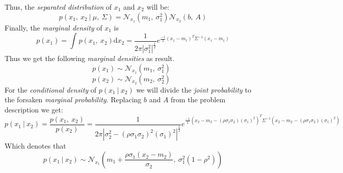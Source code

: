\documentclass[12pt]{article}
\numberwithin{equation}{section}
\numberwithin{table}{section}
\numberwithin{figure}{section}
\begin{document}
Thus, the \textit{separated distribution} of $x_1$ and $x_2$ will be:
$$
	p(x_1,\ x_2\ |\ \mu,\ \Sigma) = \mathcal{N}_{x_1}(m_1,\ \sigma_{1}^2)\mathcal{N}_{x_2}(b,\ A)
$$
Finally, the \textit{marginal density} of $x_1$ is
$$
	p(x_1) = \int_{}^{}p(x_1,\ x_2)\mathrm{d}x_2 = \frac{1}{2\pi|\sigma_{1}^2|^\frac{1}{2}} e^{\frac{-1}{2}(x_1 - m_1)^T\Sigma^{-1}(x_1 - m_1)}
$$
Thus we get the following \textit{marginal densities} as result.
$$
	p(x_1) \sim \mathcal{N}_{x_1}(m_1,\ \sigma_1^2)\ \
$$
$$
	p(x_2) \sim \mathcal{N}_{x_2}(m_2,\ \sigma_2^2)\ \
$$
For the \textit{conditional density} of $p(x_1\ |\ x_2)$ we will divide the \textit{joint probability} to the forsaken \textit{marginal probability}. Replacing $b$ and $A$ from the problem description we get:
$$
	p(x_1\ |\ x_2) = \frac{p(x_1,\ x_2)}{p(x_2)} = \frac{1}{2\pi|\sigma_{2}^2 - (\rho\sigma_1\sigma_2)^2(\sigma_1)^2|^\frac{1}{2}} e^{\frac{-1}{2}(x_2 - m_2 - (\rho\sigma_1\sigma_2)(\sigma_1)^2)^T\Sigma^{-1}(x_2 - m_2 - (\rho\sigma_1\sigma_2)(\sigma_1)^2)}
$$
Which denotes that
$$
p(x_1\ |\ x_2) \sim \mathcal{N}_{x_1}(m_1 + \frac{\rho\sigma_1(x_2 - m_2)}{\sigma_2},\ \sigma_1^2(1-\rho^2))
$$
\end{document}

